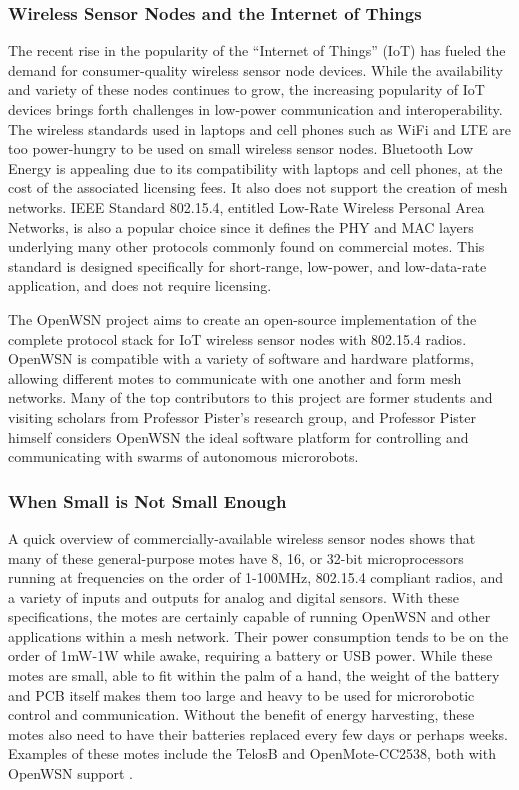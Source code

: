 \subsubsection{Wireless Sensor Nodes and the Internet of Things}
The recent rise in the popularity of the ``Internet of Things'' (IoT) has fueled the demand for consumer-quality wireless sensor node devices. While the availability and variety of these nodes continues to grow, the increasing popularity of IoT devices brings forth challenges in low-power communication and interoperability. The wireless standards used in laptops and cell phones such as WiFi and LTE are too power-hungry to be used on small wireless sensor nodes. Bluetooth Low Energy is appealing due to its compatibility with laptops and cell phones, at the cost of the associated licensing fees. It also does not support the creation of mesh networks. IEEE Standard 802.15.4, entitled Low-Rate Wireless Personal Area Networks, is also a popular choice since it defines the PHY and MAC layers underlying many other protocols commonly found on commercial motes. This standard is designed specifically for short-range, low-power, and low-data-rate application, and does not require licensing.

The OpenWSN project \cite{openwsn} aims to create an open-source implementation of the complete protocol stack for IoT wireless sensor nodes with 802.15.4 radios. OpenWSN is compatible with a variety of software and hardware platforms, allowing different motes to communicate with one another and form mesh networks. Many of the top contributors to this project are former students and visiting scholars from Professor Pister's research group, and Professor Pister himself considers OpenWSN the ideal software platform for controlling and communicating with swarms of autonomous microrobots.

\subsubsection{When Small is Not Small Enough}
A quick overview of commercially-available wireless sensor nodes shows that many of these general-purpose motes have 8, 16, or 32-bit microprocessors running at frequencies on the order of 1-100MHz, 802.15.4 compliant radios, and a variety of inputs and outputs for analog and digital sensors. With these specifications, the motes are certainly capable of running OpenWSN and other applications within a mesh network. Their power consumption tends to be on the order of 1mW-1W while awake, requiring a battery or USB power. While these motes are small, able to fit within the palm of a hand, the weight of the battery and PCB itself makes them too large and heavy to be used for microrobotic control and communication. Without the benefit of energy harvesting, these motes also need to have their batteries replaced every few days or perhaps weeks. Examples of these motes include the TelosB and OpenMote-CC2538, both with OpenWSN support \cite{openwsn-hw}.

